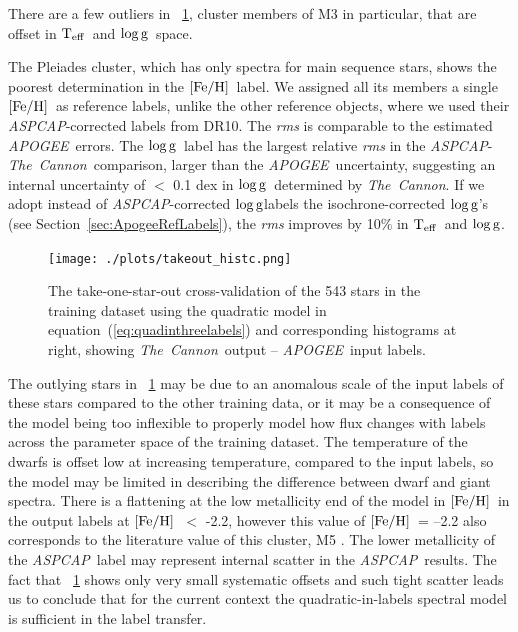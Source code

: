 \documentclass[12pt, preprint]{aastex}
\newcommand{\sectionname}{Section}
\newcommand{\tc}{\textsl{The~Cannon}}
\newcommand{\apogee}{\textsl{APOGEE}}
\newcommand{\aspcap}{\textsl{ASPCAP}}
\newcommand{\teff}{\mbox{$\rm T_{eff}$}}
\newcommand{\feh}{\mbox{$\rm [Fe/H]$}}
\newcommand{\logg}{\mbox{$\rm \log g$}}
\begin{document}
There are a few outliers in \figurename~\ref{fig:takeonestarout}, cluster members of M3 in particular, that are offset in \teff\ and \logg\ space. 

The Pleiades cluster, which has only spectra for main sequence stars, shows the poorest determination in the \feh\ label. We assigned all its members a single \feh ~as reference labels, unlike the other reference objects, where we used their \aspcap -corrected labels from DR10.
The \textit{rms} is comparable to the estimated \apogee\ errors. The \logg\ label has the largest relative \textit{rms} in the \aspcap\--\tc\ comparison, larger than the \apogee\ uncertainty, suggesting an internal uncertainty of $<$ 0.1 dex in \logg\ determined by \tc.
If we adopt instead of \aspcap -corrected \logg labels the isochrone-corrected \logg 's (see \sectionname~\ref{sec:ApogeeRefLabels}), the \textit{rms} improves by 10\% in \teff\ and \logg.

\begin{figure}[h!]
\centering
    \texttt{[image: ./plots/takeout\_histc.png]}
\caption{The take-one-star-out cross-validation of the 543 stars in the training dataset using the quadratic model in equation~(\ref{eq:quadinthreelabels}) and corresponding histograms at right, showing \tc\ output -- \apogee\ input labels.}
\label{fig:takeonestarout}
\end{figure}


The outlying stars in \figurename~\ref{fig:takeonestarout} may be due to an anomalous scale of the input labels of these stars compared to the other training data, or it may be a consequence of the model being too inflexible to properly model how flux changes with labels across the parameter space of the training dataset. 
The temperature of the dwarfs is offset low at increasing temperature, compared to the input labels, so the model may be limited in describing the difference between dwarf and giant spectra. 
There is a flattening at the low metallicity end of the model in \feh\ in the output labels at \feh\ $<$ -2.2, however this value of \feh\ = --2.2 also corresponds to the literature value of this cluster, M5 \citep{Meszaros2013}. 
The lower metallicity of the \aspcap\ label may represent internal scatter in the \aspcap\ results.
The fact that \figurename~\ref{fig:takeonestarout} shows only very small systematic offsets and such tight scatter leads us to conclude that for the
current context the quadratic-in-labels spectral model is sufficient in the label transfer. 
\end{document}
